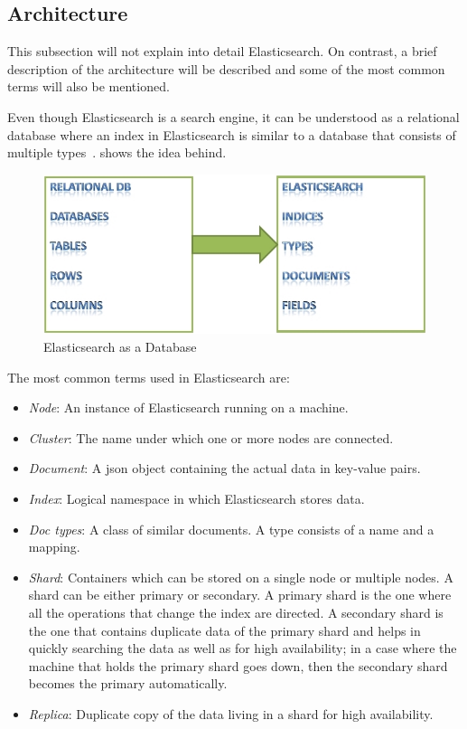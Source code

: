 \subsection{Architecture}
This subsection will not explain into detail Elasticsearch. On contrast, a brief description of the architecture will be described and some of the most common terms will also be mentioned.\par
Even though Elasticsearch is a search engine, it can be understood as a relational database where an index in Elasticsearch is similar to a database that consists of multiple types~\cite{elastic2}.  shows the idea behind.
\begin{figure}
	\includegraphics[width=\linewidth]{img/elastic_1.png}
	\caption{Elasticsearch as a Database~\cite{elastic2}}
	\label{fig:elastic1}
\end{figure}
The most common terms used in Elasticsearch are:
\begin{itemize}
	\item \textit{Node}: An instance of Elasticsearch running on a machine.
	\item \textit{Cluster}: The name under which one or more nodes are connected.
	\item \textit{Document}: A \ac{json} object containing the actual data in key-value pairs.
	\item \textit{Index}: Logical namespace in which Elasticsearch stores data.
	\item \textit{Doc types}: A class of similar documents. A type consists of a name and a mapping.
	\item \textit{Shard}: Containers which can be stored on a single node or multiple nodes. A  shard can be either primary or secondary. A primary shard is the one where all the operations that change the index are directed. A secondary shard is the one that contains duplicate data of the primary shard and helps in quickly searching the data as well as for high availability; in a case where the machine that holds the primary shard goes down, then the secondary shard becomes the primary automatically.
	\item \textit{Replica}: Duplicate copy of the data living in a shard for high availability.
\end{itemize}






